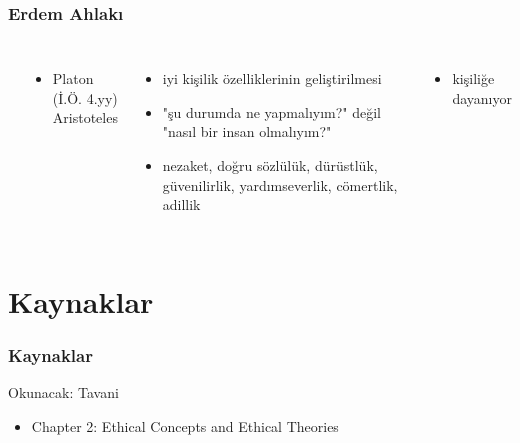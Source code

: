 \documentclass[dvipsnames]{beamer}
\theoremstyle{definition}
\theoremstyle{example}
\theoremstyle{plain}
\begin{document}
\begin{frame}
  \frametitle{Erdem Ahlakı}

  \begin{columns}
    \begin{center}
    \end{center}
    \begin{itemize}
      \item Platon (İ.Ö. 4.yy)\\
        Aristoteles
    \end{itemize}

    \pause
    \begin{itemize}
      \item iyi kişilik özelliklerinin geliştirilmesi

      \item "şu durumda ne yapmalıyım?" değil\\
        "nasıl bir insan olmalıyım?"

      \item nezaket, doğru sözlülük, dürüstlük, güvenilirlik, yardımseverlik,
        cömertlik, adillik
    \end{itemize}

    \pause
    \begin{itemize}
      \item kişiliğe dayanıyor
    \end{itemize}
  \end{columns}
\end{frame}

\section*{Kaynaklar}

\begin{frame}
  \frametitle{Kaynaklar}

  \begin{block}{Okunacak: Tavani}
    \begin{itemize}
      \item Chapter 2: \alert{Ethical Concepts and Ethical Theories}
    \end{itemize}
  \end{block}
\end{frame}
\end{document}
